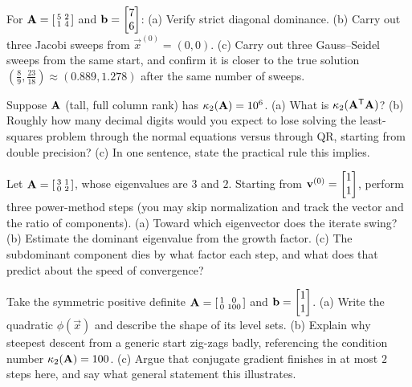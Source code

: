 \begin{exercise}
For $\mathbf{A}=\left[\begin{smallmatrix}5 & 2\\ 1 & 4\end{smallmatrix}\right]$ and
$\mathbf{b}=\begin{bmatrix}7\\6\end{bmatrix}$: (a) Verify strict diagonal dominance. (b) Carry out three
Jacobi sweeps from $\vec{x}^{(0)}=(0,0)$. (c) Carry out three Gauss--Seidel sweeps from
the same start, and confirm it is closer to the true solution $(\tfrac{8}{9},
\tfrac{23}{18})\approx(0.889,1.278)$ after the same number of sweeps.
\end{exercise}

\begin{exercise}
Suppose $\mathbf{A}$ (tall, full column rank) has $\kappa_2(\mathbf{A})=10^{6}$. (a) What is
$\kappa_2(\mathbf{A}^{\mathsf{T}}\mathbf{A})$? (b) Roughly how many decimal digits would you expect to
lose solving the least-squares problem through the normal equations versus through QR,
starting from double precision? (c) In one sentence, state the practical rule this
implies.
\end{exercise}

\begin{exercise}
Let $\mathbf{A}=\left[\begin{smallmatrix}3 & 1\\ 0 & 2\end{smallmatrix}\right]$, whose
eigenvalues are $3$ and $2$. Starting from $\mathbf{v}^{(0)}=\begin{bmatrix}1\\1\end{bmatrix}$, perform three
power-method steps (you may skip normalization and track the vector and the ratio
of components). (a) Toward which eigenvector does the iterate swing? (b) Estimate the
dominant eigenvalue from the growth factor. (c) The subdominant component dies by what
factor each step, and what does that predict about the speed of convergence?
\end{exercise}

\begin{exercise}
Take the symmetric positive definite $\mathbf{A}=\left[\begin{smallmatrix}1 & 0\\ 0 &
100\end{smallmatrix}\right]$ and $\mathbf{b}=\begin{bmatrix}1\\1\end{bmatrix}$. (a) Write the quadratic
$\phi(\vec{x})$ and describe the shape of its level sets. (b) Explain why steepest
descent from a generic start zig-zags badly, referencing the condition number
$\kappa_2(\mathbf{A})=100$. (c) Argue that conjugate gradient finishes in at most $2$
steps here, and say what general statement this illustrates.
\end{exercise}

